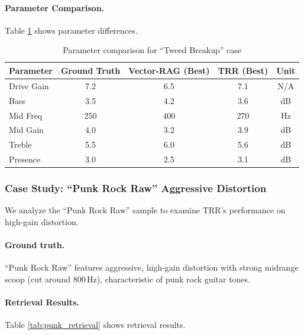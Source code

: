 \paragraph{Parameter Comparison.} Table \ref{tab:tweed_params} shows parameter differences.

\begin{table}[h]
	\centering
	\caption{Parameter comparison for ``Tweed Breakup'' case}
	\label{tab:tweed_params}
	\small
	\begin{tabular}{lcccc}
		\toprule
		\textbf{Parameter} & \textbf{Ground Truth} & \textbf{Vector-RAG (Best)} & \textbf{TRR (Best)} & \textbf{Unit} \\
		\midrule
		Drive Gain         & 7.2                   & 6.5                        & 7.1                 & N/A           \\
		Bass               & 3.5                   & 4.2                        & 3.6                 & dB            \\
		Mid Freq           & 250                   & 400                        & 270                 & Hz            \\
		Mid Gain           & 4.0                   & 3.2                        & 3.9                 & dB            \\
		Treble             & 5.5                   & 6.0                        & 5.6                 & dB            \\
		Presence           & 3.0                   & 2.5                        & 3.1                 & dB            \\
		\bottomrule
	\end{tabular}
\end{table}

\subsubsection{Case Study: ``Punk Rock Raw'' Aggressive Distortion}

We analyze the ``Punk Rock Raw'' sample to examine TRR's performance on high-gain distortion.

\paragraph{Ground truth.} ``Punk Rock Raw'' features aggressive, high-gain distortion with strong midrange scoop (cut around 800\,Hz), characteristic of punk rock guitar tones.

\paragraph{Retrieval Results.} Table \ref{tab:punk_retrieval} shows retrieval results.

